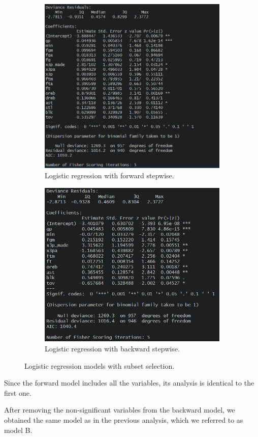 \begin{figure}[h]
	\begin{subfigure}{.6\textwidth}
		\centering
		\includegraphics[width=0.7\linewidth]{ImageFiles/Classification/LogReg/lr_fss_summary}
		\caption{Logistic regression with forward stepwise.}
		\label{fig:LRFSSSum}
	\end{subfigure}
	\begin{subfigure}{.6\textwidth}
		\centering
		\includegraphics[width=0.7\linewidth]{ImageFiles/Classification/LogReg/lr_bss_summary}
		\caption{Logistic regression with backward stepwise.}
		\label{fig:LRBSSSum}
	\end{subfigure}
	\caption{Logistic regression models with subset selection.}
	\label{fig:LRSSSum}
\end{figure}

Since the forward model includes all the variables, its analysis is identical to the first one.

After removing the non-significant variables from the backward model, we obtained the same model as in the previous analysis, which we referred to as model B. 

